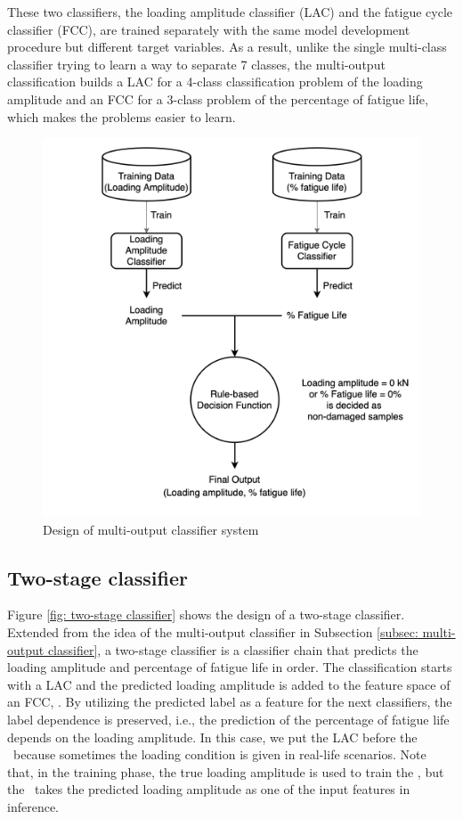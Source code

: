 These two classifiers, the loading amplitude classifier (LAC) and the fatigue cycle classifier (FCC), are trained separately with the same model development procedure but different target variables. As a result, unlike the single multi-class classifier trying to learn a way to separate 7 classes, the multi-output classification builds a LAC for a 4-class classification problem of the loading amplitude and an FCC for a 3-class problem of the percentage of fatigue life, which makes the problems easier to learn.

\begin{figure}[tb]
    \centering
    \includegraphics[width=0.9\linewidth]{fig/multi-ouput_classifier.png}
    \caption{Design of multi-output classifier system}
    \label{fig: multi-output classifier}
\end{figure}

\subsection{Two-stage classifier}
Figure \ref{fig: two-stage classifier} shows the design of a two-stage classifier. Extended from the idea of the multi-output classifier in Subsection \ref{subsec: multi-output classifier}, a two-stage classifier is a classifier chain \cite{classifier-chain-READ2007} that predicts the loading amplitude and percentage of fatigue life in order. The classification starts with a LAC and the predicted loading amplitude is added to the feature space of an FCC, \fcctwo. By utilizing the predicted label as a feature for the next classifiers, the label dependence is preserved, i.e., the prediction of the percentage of fatigue life depends on the loading amplitude. In this case, we put the LAC before the \fcctwo \  because sometimes the loading condition is given in real-life scenarios. Note that, in the training phase, the true loading amplitude is used to train the \fcctwo, but the \fcctwo \ takes the predicted loading amplitude as one of the input features in inference.

